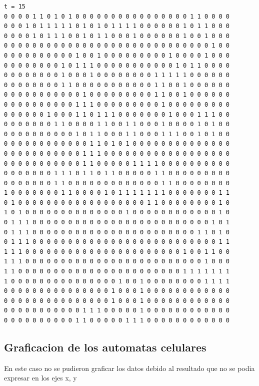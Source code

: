 \documentclass[a4paper,12pt]{article}
\begin{document}
\begin{verbatim}
t = 15
0 0 0 0 1 1 0 1 0 1 0 0 0 0 0 0 0 0 0 0 0 0 0 0 0 0 1 1 0 0 0 0 
0 0 0 1 0 1 1 1 1 1 0 1 0 1 0 1 1 1 1 0 0 0 0 0 0 1 0 1 1 0 0 0 
0 0 0 0 1 0 1 1 1 0 0 1 0 1 1 0 0 0 1 0 0 0 0 0 0 1 0 0 1 0 0 0 
0 0 0 0 0 0 0 0 0 0 0 0 0 0 0 0 0 0 0 0 0 0 0 0 0 0 0 0 0 1 0 0 
0 0 0 0 0 0 0 0 0 0 1 0 0 1 0 0 0 0 0 0 0 0 0 1 0 0 0 0 1 0 0 0 
0 0 0 0 0 0 0 0 1 0 1 1 1 0 0 0 0 0 0 0 0 0 0 0 1 0 1 1 0 0 0 0 
0 0 0 0 0 0 0 0 1 0 0 0 1 0 0 0 0 0 0 0 0 1 1 1 1 1 0 0 0 0 0 0 
0 0 0 0 0 0 0 0 1 1 0 0 0 0 0 0 0 0 0 0 0 1 1 0 0 1 0 0 0 0 0 0 
0 0 0 0 0 0 0 0 0 0 0 1 0 0 0 0 0 0 0 0 0 1 1 0 0 1 0 0 0 0 0 0 
0 0 0 0 0 0 0 0 0 0 1 1 1 0 0 0 0 0 0 0 0 0 1 0 0 0 0 0 0 0 0 0 
0 0 0 0 0 0 1 0 0 0 1 1 0 1 1 1 0 0 0 0 0 0 0 1 0 0 0 1 1 1 0 0 
0 0 0 0 0 0 0 1 1 0 0 0 0 1 1 0 0 1 1 0 0 0 1 0 0 0 0 1 0 1 0 0 
0 0 0 0 0 0 0 0 0 0 1 0 1 1 0 0 0 1 1 0 0 0 1 1 1 0 0 1 0 1 0 0 
0 0 0 0 0 0 0 0 0 0 0 0 1 1 0 1 0 1 0 0 0 0 0 0 0 0 0 0 0 0 0 0 
0 0 0 0 0 0 0 0 0 0 0 1 1 1 0 0 0 0 0 0 0 0 0 0 0 0 0 0 0 0 0 0 
0 0 0 0 0 0 0 0 0 0 0 1 1 0 0 0 0 0 1 1 1 1 0 0 0 0 0 0 0 0 0 0 
0 0 0 0 0 0 0 1 1 1 0 1 1 0 1 1 0 0 0 0 0 1 1 0 0 0 0 0 0 0 0 0 
0 0 0 0 0 0 0 1 1 0 0 0 0 0 0 0 0 0 0 0 0 0 1 1 0 0 0 0 0 0 0 0 
1 0 0 0 0 0 0 0 1 1 0 0 0 0 1 0 1 1 1 1 1 1 1 0 0 0 0 0 0 0 1 1 
0 1 0 0 0 0 0 0 0 0 0 0 0 0 0 0 0 0 0 0 1 1 0 0 0 0 0 0 0 0 1 0 
1 0 1 0 0 0 0 0 0 0 0 0 0 0 0 0 0 1 0 0 0 0 0 0 0 0 0 0 0 0 1 0 
0 1 1 1 0 0 0 0 0 0 0 0 0 0 0 0 0 0 0 0 0 0 0 0 0 0 0 0 0 1 0 1 
0 1 1 1 0 0 0 0 0 0 0 0 0 0 0 0 0 0 0 0 0 0 0 0 0 0 0 1 1 0 1 0 
0 1 1 1 0 0 0 0 0 0 0 0 0 0 0 0 0 0 0 0 0 0 0 0 0 0 0 0 0 0 1 1 
1 1 1 0 0 0 0 0 0 0 0 0 0 0 0 0 0 0 0 0 0 0 0 0 0 1 0 0 1 1 0 0 
1 1 1 0 0 0 0 0 0 0 0 0 0 0 0 0 0 0 0 0 0 0 0 0 0 0 0 0 1 0 0 0 
1 1 0 0 0 0 0 0 0 0 0 0 0 0 0 0 0 0 0 0 0 0 0 0 0 1 1 1 1 1 1 1 
1 0 0 0 0 0 0 0 0 0 0 0 0 0 0 0 1 0 0 1 0 0 0 0 0 0 0 0 1 1 1 1 
0 0 0 0 0 0 0 0 0 0 0 0 0 0 0 1 0 0 0 1 0 0 0 0 0 0 0 0 0 0 0 0 
0 0 0 0 0 0 0 0 0 0 0 0 0 0 0 1 0 0 0 1 0 0 0 0 0 0 0 0 0 0 0 0 
0 0 0 0 0 0 0 0 0 0 0 1 1 1 0 0 0 0 0 1 0 0 0 0 0 0 0 0 0 0 0 0 
0 0 0 0 0 0 0 0 0 0 1 1 0 0 0 0 0 1 1 1 0 0 0 0 0 0 0 0 0 0 0 0 

  \end{verbatim}

 \subsection{Graficacion de los automatas celulares}
   En este caso no se pudieron graficar los datos debido al resultado que no se podia expresar en los ejes x, y
\end{document}
